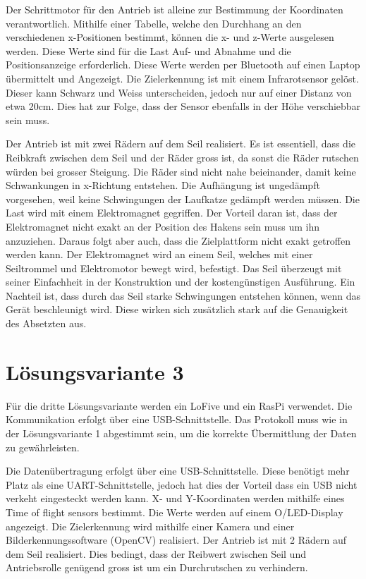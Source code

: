 \documentclass[a4paper]{report}
\begin{document}
Der Schrittmotor für den Antrieb ist alleine zur Bestimmung der Koordinaten verantwortlich. Mithilfe einer Tabelle, welche den Durchhang an den verschiedenen x-Positionen bestimmt, können die x- und z-Werte ausgelesen werden. Diese Werte sind für die Last Auf- und Abnahme und die Positionsanzeige erforderlich. Diese Werte werden per Bluetooth auf einen Laptop übermittelt und Angezeigt. Die Zielerkennung ist mit einem Infrarotsensor gelöst. Dieser kann Schwarz und Weiss unterscheiden, jedoch nur auf einer Distanz von etwa 20cm. Dies hat zur Folge, dass der Sensor ebenfalls in der Höhe verschiebbar sein muss.

Der Antrieb ist mit zwei Rädern auf dem Seil realisiert. Es ist essentiell, dass die Reibkraft zwischen dem Seil und der Räder gross ist, da sonst die Räder rutschen würden bei grosser Steigung. Die Räder sind nicht nahe beieinander, damit keine Schwankungen in x-Richtung entstehen. Die Aufhängung ist ungedämpft vorgesehen, weil keine Schwingungen der Laufkatze gedämpft werden müssen.
Die Last wird mit einem Elektromagnet gegriffen. Der Vorteil daran ist, dass der Elektromagnet nicht exakt an der Position des Hakens sein muss um ihn anzuziehen. Daraus folgt aber auch, dass die Zielplattform nicht exakt getroffen werden kann. Der Elektromagnet wird an einem Seil, welches mit einer Seiltrommel und Elektromotor bewegt wird, befestigt. Das Seil überzeugt mit seiner Einfachheit in der Konstruktion und der kostengünstigen Ausführung. Ein Nachteil ist, dass durch das Seil starke Schwingungen entstehen können, wenn das Gerät beschleunigt wird. Diese wirken sich zusätzlich stark auf die Genauigkeit des Absetzten aus.

\section{Lösungsvariante 3}
\label{app:sec:Lvar3}
Für die dritte Lösungsvariante werden ein LoFive und ein RasPi verwendet. Die Kommunikation erfolgt über eine USB-Schnittstelle. Das Protokoll muss wie in der Lösungs\-variante 1 abgestimmt sein, um die korrekte Übermittlung der Daten zu gewährleisten.

Die Datenübertragung erfolgt über eine USB-Schnittstelle. Diese benötigt mehr Platz als eine UART-Schnittstelle, jedoch hat dies der Vorteil dass ein USB nicht verkeht eingesteckt werden kann.
X- und Y-Koordinaten werden mithilfe eines Time of flight sensors bestimmt. Die Werte werden auf einem O/LED-Display angezeigt.
Die Zielerkennung wird mithilfe einer Kamera und einer Bilderkennungssoftware (OpenCV) realisiert. Der Antrieb ist mit 2 Rädern auf dem Seil realisiert. Dies bedingt, dass der Reibwert zwischen Seil und Antriebsrolle genügend gross ist um ein Durchrutschen zu verhindern.
\end{document}
